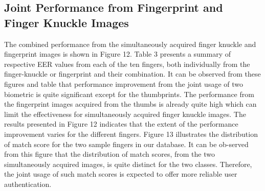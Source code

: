 \subsection{Joint Performance from Fingerprint and Finger Knuckle Images}

The combined performance from the simultaneously acquired finger knuckle and fingerprint images is shown in Figure 12. Table 3 presents a summary of respective EER values from each of the ten fingers, both individually from the finger-knuckle or fingerprint and their combination. It can be observed from these figures and table that performance improvement from the joint usage of two biometric is quite significant except for the thumbprints. The performance from the fingerprint images acquired from the thumbs is already quite high which can limit the effectiveness for simultaneously acquired finger knuckle images. The results presented in Figure 12 indicates that the extent of the performance improvement varies for the different fingers. Figure 13 illustrates the distribution of match score for the two sample fingers in our database. It can be ob-served from this figure that the distribution of match scores, from the two simultaneously acquired images, is quite distinct for the two classes. Therefore, the joint usage of such match scores is expected to offer more reliable user authentication.